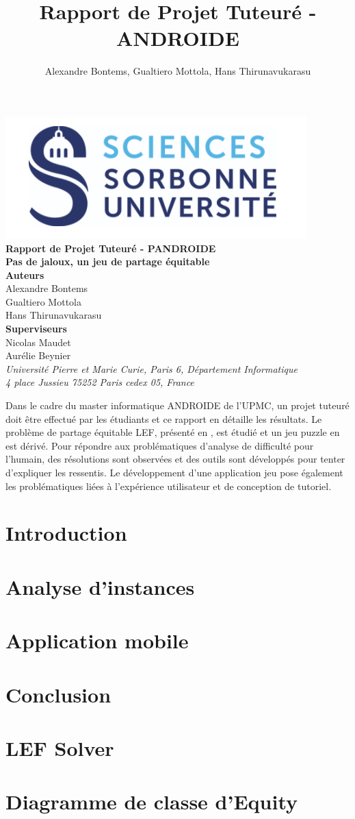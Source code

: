 \documentclass[a4paper, 11pt, titlepage]{article}
\title{Rapport de Projet Tuteuré - ANDROIDE}
\author{Alexandre Bontems, Gualtiero Mottola, Hans Thirunavukarasu}
\begin{document}
	
	\begin{center}
	    \includegraphics[width=0.3\linewidth]{sorbonne}\\[0.8cm]
	    \textsf{\large\bfseries Rapport de Projet Tuteuré - PANDROIDE}\\[0.25cm]
	    \textsf{\Large\bfseries Pas de jaloux, un jeu de partage équitable}\\[0.5cm]
	    \textbf{Auteurs}\\
	    Alexandre Bontems\\Gualtiero Mottola\\Hans Thirunavukarasu\\[0.25cm]
	    \textbf{Superviseurs}\\
	    Nicolas Maudet\\Aurélie Beynier\\[0.5cm]
	    \textit{Université Pierre et Marie Curie, Paris 6, Département Informatique\\4 place Jussieu 75252 Paris cedex 05, France}\\[0.5cm]
	\end{center}
	\begin{adjustwidth}{.5in}{.5in}\small
	    Dans le cadre du master informatique \textsf{ANDROIDE} de l'UPMC, un projet tuteuré doit être effectué par les étudiants et ce rapport en détaille les résultats. Le problème de partage équitable LEF, présenté en \cite{lef}, est étudié et un jeu puzzle en est dérivé. Pour répondre aux problématiques d'analyse de difficulté pour l'humain, des résolutions  sont observées et des outils sont développés pour tenter d'expliquer les ressentis. Le développement d'une application jeu pose également les problématiques liées à l'expérience utilisateur et de conception de tutoriel. 
	\end{adjustwidth}
	\tableofcontents

	\section{Introduction}
		
	\section{Analyse d'instances}
	    \label{sec-analyse}
        
	\section{Application mobile}
	    \label{app}
	    
	\section{Conclusion}
	
%	
    \printbibliography[heading=bibintoc]
    \begin{appendix}
        \section{LEF Solver}
        \section{Diagramme de classe d'Equity}
    \end{appendix}
\end{document}
